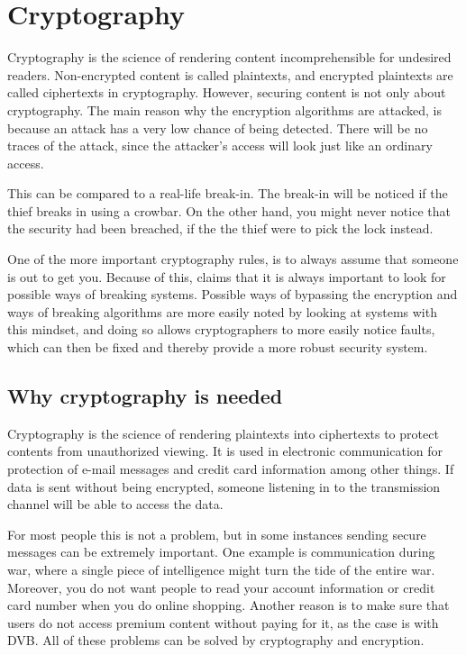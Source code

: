 \chapter{Cryptography}\label{ch:Scrambling}
Cryptography is the science of rendering content incomprehensible for 
undesired readers. Non-encrypted content is called plaintexts, and 
encrypted plaintexts are called ciphertexts in cryptography. However, 
securing content is not only about cryptography. The main reason why 
the encryption algorithms are attacked, is because an attack has a 
very low chance of being detected. There will be no traces of the 
attack, since the attacker’s access will look just like an ordinary 
access. \citep{Schneier:2003}

This can be compared to a real-life break-in. The break-in will be 
noticed if the thief breaks in using a crowbar. On the other hand, you 
might never notice that the security had been breached, if the the 
thief were to pick the lock instead. \citep{Schneier:2003}

One of the more important cryptography rules, is to always assume that 
someone is out to get you. Because of this, 
\citet[pp. 12--14]{Schneier:2003} claims that it is always important to
look for possible ways of breaking systems. Possible ways of bypassing 
the encryption and ways of breaking algorithms are more easily noted 
by looking at systems with this mindset, and doing so allows 
cryptographers to more easily notice faults, which can then be fixed 
and thereby provide a more robust security system.

\section{Why cryptography is needed}
Cryptography is the science of rendering plaintexts into ciphertexts to
protect contents from unauthorized viewing. It is used in electronic 
communication for protection of e-mail messages and credit card 
information among other things. If data is sent without being 
encrypted, someone listening in to the transmission channel will be 
able to access the data.

For most people this is not a problem, but in some instances sending 
secure messages can be extremely important. One example is 
communication during war, where a single piece of intelligence might 
turn the tide of the entire war. Moreover, you do not want people to 
read your account information or credit card number when you do online 
shopping. Another reason is to make sure that users do not access 
premium content without paying for it, as the case is with DVB. All of 
these problems can be solved by cryptography and encryption.


